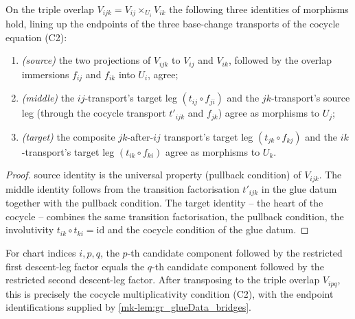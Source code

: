 \begin{lemma}\label{mk-lem:gr_glueData_bridges}
  \leanok

  On the triple overlap \(V_{ijk} = V_{ij}\times_{U_i} V_{ik}\) the following three
  identities of morphisms hold, lining up the endpoints of the three base-change
  transports of the cocycle equation (C2):
  \begin{enumerate}
    \item \emph{(source)} the two projections of \(V_{ijk}\) to \(V_{ij}\) and \(V_{ik}\),
      followed by the overlap immersions \(f_{ij}\) and \(f_{ik}\) into \(U_i\),
      agree;
    \item \emph{(middle)} the \(ij\)-transport's target leg
      \((t_{ij}\circ f_{ji})\) and the \(jk\)-transport's source leg
      (through the cocycle transport \(t'_{ijk}\) and \(f_{jk}\)) agree as morphisms
      to \(U_j\);
    \item \emph{(target)} the composite \(jk\)-after-\(ij\) transport's target leg
      \((t_{jk}\circ f_{kj})\) and the \(ik\)-transport's target leg
      \((t_{ik}\circ f_{ki})\) agree as morphisms to \(U_k\).
  \end{enumerate}
\end{lemma}
\begin{proof}
  \leanokThe source identity is the universal property (pullback condition) of \(V_{ijk}\).
  The middle identity follows from the transition factorisation
  \(t'_{ijk}\) in the glue datum together with the pullback condition.
  The target identity -- the heart of the cocycle -- combines the same transition
  factorisation, the pullback condition, the involutivity \(t_{ik}\circ t_{ki}=\mathrm{id}\)
  and the cocycle condition of the glue datum.
\end{proof}

\begin{lemma}\label{mk-lem:gr_glueChartComponent_leg_compat}
  \leanok

  For chart indices \(i,p,q\), the \(p\)-th candidate component followed by the
  restricted first descent-leg factor equals the \(q\)-th candidate component followed
  by the restricted second descent-leg factor.  After transposing to the triple overlap
  \(V_{ipq}\), this is precisely the cocycle multiplicativity condition (C2), with the
  endpoint identifications supplied by \ref{mk-lem:gr_glueData_bridges}.
\end{lemma}


